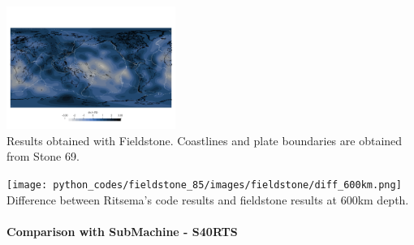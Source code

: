 \begin{center}
\includegraphics[width=5.5cm]{python_codes/fieldstone_85/images/fieldstone/fieldstone_S20RTS_2891km.png}\\
{\captionfont Results obtained with Fieldstone. Coastlines and plate boundaries are obtained from Stone 69.}
\end{center}


\begin{center}
\texttt{[image: python\_codes/fieldstone\_85/images/fieldstone/diff\_600km.png]}\\
{\captionfont Difference between Ritsema's code results and fieldstone results at 600\si{km} depth.}
\end{center}


\newpage
\paragraph{Comparison with SubMachine - S40RTS}

